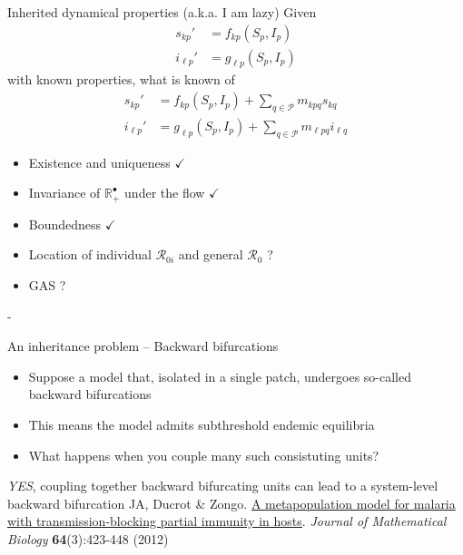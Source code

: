 \documentclass[aspectratio=43]{beamer}
\begin{document}
\begin{frame}{Inherited dynamical properties (a.k.a. I am lazy)}
	Given
	\begin{subequations}
		\begin{align}
			s_{kp}' &= f_{kp}(S_p,I_p) \label{sys:generic_intra_ds} \\
			i_{\ell p}' &= g_{\ell p}(S_p,I_p) \label{sys:generic_intra_di}
		\end{align}				
	\end{subequations}
	with known properties, what is known of
	\begin{subequations}
		\begin{align}
			s_{kp}' &= f_{kp}(S_p,I_p)+\textstyle{\sum_{q\in\mathcal{P}}} m_{kpq}s_{kq} 
			\label{sys:generic_inter_ds} \\
			i_{\ell p}' &= g_{\ell p}(S_p,I_p)+\textstyle{\sum_{q\in\mathcal{P}}} m_{\ell pq}i_{\ell q}
			\label{sys:generic_inter_di}
		\end{align}				
	\end{subequations}
	\begin{itemize}
		\item Existence and uniqueness $\checkmark$
		\item Invariance of $\mathbb{R}_+^\bullet$ under the flow $\checkmark$
		\item Boundedness $\checkmark$
		\item Location of individual $\mathcal{R}_{0i}$ and general $\mathcal{R}_0$ ?
		\item GAS ?		
	\end{itemize}
	- 
\end{frame}

\begin{frame}{An inheritance problem -- Backward bifurcations}
	\begin{itemize}
		\item Suppose a model that, isolated in a single patch, undergoes so-called backward bifurcations
		\item This means the model admits subthreshold endemic equilibria
		\item What happens when you couple many such consistuting units?
	\end{itemize}
	\vfill
	\emph{YES}, coupling together backward bifurcating units can lead to a system-level backward bifurcation
	\vfill
	JA, Ducrot \& Zongo. \href{https://julien-arino.github.io/assets/pdf/papers/2012_ArinoDucrotZongo-JMB64.pdf}{A metapopulation model for malaria with transmission-blocking partial immunity in hosts}. \emph{Journal of Mathematical Biology} \textbf{64}(3):423-448 (2012) 		
\end{frame}
\end{document}
